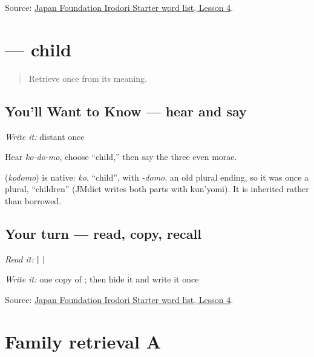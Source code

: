 \begin{tcolorbox}[breakable,colback=teal!4,colframe=teal!35!black,title={Before you move on}]
Source: \href{https://www.irodori.jpf.go.jp/assets/data/wordlist\_X.pdf}{Japan Foundation Irodori Starter word list, Lesson 4}.
\end{tcolorbox}
\section[\texorpdfstring{\ja{こども} (kodomo)}{こども (kodomo)}]{ — child}

\label{lesson:JA-C13-kodomo}



\begin{quote}
Retrieve \textbf{} once from its meaning.
\end{quote}

\subsection*{You'll Want to Know — hear and say}
\emph{Write it:} distant \textbf{} once

Hear \emph{ko-do-mo}, choose “child,” then say the three even morae.

\begin{cousinweb}
\textbf{} (\emph{kodomo}) is native: \emph{ko}, \textquotedblleft{}child\textquotedblright{}, with \emph{-domo}, an old plural ending, so it was once a plural, \textquotedblleft{}children\textquotedblright{} (JMdict writes both parts with kun'yomi). It is inherited rather than borrowed.
\end{cousinweb}

\subsection*{Your turn — read, copy, recall}
\emph{Read it:} \textbf{ |  | }

\emph{Write it:} one copy of \textbf{}; then hide it and write it once

\begin{tcolorbox}[breakable,colback=teal!4,colframe=teal!35!black,title={Before you move on}]
Source: \href{https://www.irodori.jpf.go.jp/assets/data/wordlist\_X.pdf}{Japan Foundation Irodori Starter word list, Lesson 4}.
\end{tcolorbox}
\section[Practice]{Family retrieval A}

